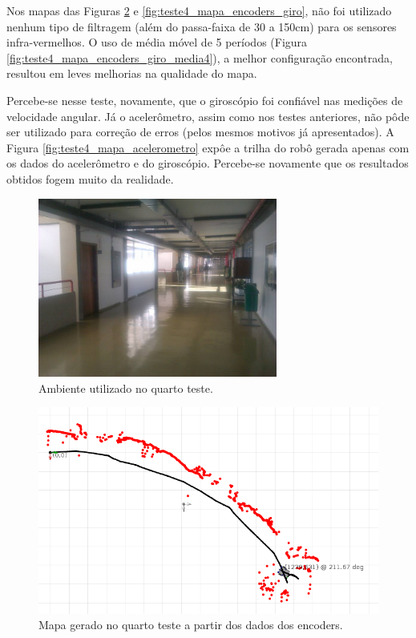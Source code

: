 Nos mapas das Figuras \ref{fig:teste4_mapa_encoders} e \ref{fig:teste4_mapa_encoders_giro}, não foi utilizado nenhum tipo de filtragem (além do passa-faixa de 30 a 150cm) para os sensores infra-vermelhos. O uso de média móvel de 5 períodos (Figura \ref{fig:teste4_mapa_encoders_giro_media4}), a melhor configuração encontrada, resultou em leves melhorias na qualidade do mapa.

Percebe-se nesse teste, novamente, que o giroscópio foi confiável nas medições de velocidade angular. Já o acelerômetro, assim como nos testes anteriores, não pôde ser utilizado para correção de erros (pelos mesmos motivos já apresentados). A Figura \ref{fig:teste4_mapa_acelerometro} expôe a trilha do robô gerada apenas com os dados do acelerômetro e do giroscópio. Percebe-se novamente que os resultados obtidos fogem muito da realidade.

\begin{figure}[H]
	\centering
	\includegraphics[width=0.7\textwidth]{./figuras/testes/teste4/foto_ambiente.jpg}
	\caption{Ambiente utilizado no quarto teste.}
	\label{fig:teste4_foto}
\end{figure}

\begin{figure}[H]
	\centering
	\includegraphics[width=1\textwidth]{./figuras/testes/teste4/mapa_encoders.png}
	\caption{Mapa gerado no quarto teste a partir dos dados dos encoders.}
	\label{fig:teste4_mapa_encoders}
\end{figure}

